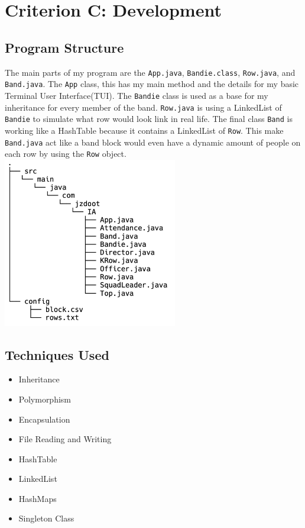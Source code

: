 \documentclass{article}
\begin{document}
\section{Criterion C: Development}
\subsection{Program Structure}
The main parts of my program are the \verb|App.java|, \verb|Bandie.class|, \verb|Row.java|, and \verb|Band.java|. The \verb|App| class, this has my main method and the details for my basic Terminal User Interface(TUI). The \verb|Bandie| class is used as a base for my inheritance for every member of the band. \verb|Row.java| is using a LinkedList\cite{linkedList} of \verb|Bandie| to simulate what row would look link in real life. The final class \verb|Band| is working like a HashTable\cite{hashTable} because it contains a LinkedList\cite{linkedList} of \verb|Row|. This make \verb|Band.java| act like a band block would even have a dynamic amount of people on each row by using the \verb|Row| object.\\
\includegraphics[width=3in]{fileStructure.png}
\subsection{Techniques Used}
\begin{itemize}
	\item Inheritance
	\item Polymorphism
	\item Encapsulation
	\item File Reading and Writing
	\item HashTable\cite{hashTable}
	\item LinkedList\cite{linkedList}
	\item HashMaps\cite{hashMap}
	\item Singleton Class
\end{itemize}
\end{document}
